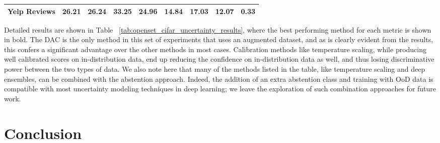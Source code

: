 \documentclass[accepted]{uai2021} \pdfoutput=1
\begin{document}
\begin{table*}[htbp]
{\begin{tabular}{lllclllll}
	\multicolumn{1}{l|}{Yelp Reviews}       & 26.21                      & 26.24                      & \multicolumn{1}{l}{33.25}                                    & 24.96                                                                       & 14.84                     & 17.03                                                                        & 12.07                    & \textbf{0.33}           \\ \hline
	
\end{tabular}}
	
	\caption{The performance of DAC as an OoD detector, evaluated on various metrics and compared against competing baselines. All experiments used the ResNet-34 architecture, except for MC Dropout, in which case we used the WideResNet 28x10 network.  and   indicate that higher and lower values are better, respectively. Best performing methods (ignoring statistically insignificant differences)on each metric are in bold.}
	\label{tab:openset_cifar_uncertainty_results}
\end{table*}

Detailed results are shown in Table ~\ref{tab:openset_cifar_uncertainty_results}, where the best performing method for each metric is shown in bold.  The DAC is the only method in this set of experiments that uses an augmented dataset, and as is clearly evident from the results, this confers a significant advantage over the other methods in most cases. 
Calibration methods like temperature scaling, while producing well calibrated scores on in-distribution data, end up reducing the confidence on in-distribution data as well, and thus losing discriminative power between the two types of data. We also note here that many of the methods listed in the table, like temperature scaling and deep ensembles, can be combined with the abstention approach.  Indeed, the addition of an extra abstention class and training with OoD data is compatible with most uncertainty modeling techniques in deep learning; we leave the exploration of such combination approaches for future work.






\section{Conclusion}
\end{document}

